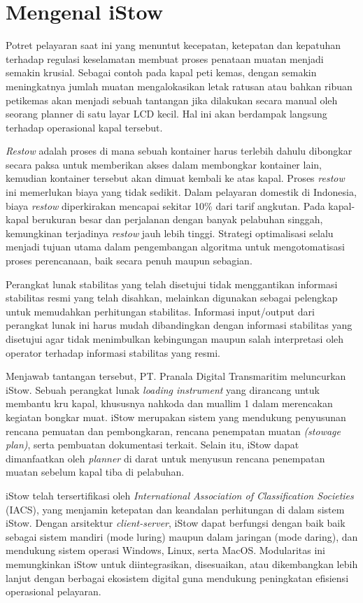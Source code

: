 \chapter{Mengenal iStow}
\label{ch:mengenal-iStow}


Potret pelayaran saat ini yang menuntut kecepatan, ketepatan dan kepatuhan terhadap regulasi keselamatan membuat proses penataan muatan menjadi semakin krusial. Sebagai contoh pada kapal peti kemas, dengan semakin meningkatnya jumlah muatan mengalokasikan letak ratusan atau bahkan ribuan petikemas akan menjadi sebuah tantangan jika dilakukan secara manual oleh seorang planner di satu layar LCD kecil. Hal ini akan berdampak langsung terhadap operasional kapal tersebut.

{ \em Restow} adalah proses di mana sebuah kontainer harus terlebih dahulu dibongkar secara paksa untuk memberikan akses dalam membongkar kontainer lain, kemudian kontainer tersebut akan dimuat kembali ke atas kapal. Proses {\em restow} ini memerlukan biaya yang tidak sedikit. Dalam pelayaran domestik di Indonesia, biaya {\em restow} diperkirakan mencapai sekitar 10\% dari tarif angkutan. Pada kapal-kapal berukuran besar dan perjalanan dengan banyak pelabuhan singgah, kemungkinan terjadinya {\em restow} jauh lebih tinggi. Strategi optimalisasi selalu menjadi tujuan utama dalam pengembangan algoritma untuk mengotomatisasi proses perencanaan, baik secara penuh maupun sebagian.

Perangkat lunak stabilitas yang telah disetujui tidak menggantikan informasi stabilitas resmi yang telah disahkan, melainkan digunakan sebagai pelengkap untuk memudahkan perhitungan stabilitas. Informasi input/output dari perangkat lunak ini harus mudah dibandingkan dengan informasi stabilitas yang disetujui agar tidak menimbulkan kebingungan maupun salah interpretasi oleh operator terhadap informasi stabilitas yang resmi.

Menjawab tantangan tersebut, PT. Pranala Digital Transmaritim meluncurkan iStow. Sebuah perangkat lunak {\em loading instrument} yang dirancang untuk membantu kru kapal, khususnya nahkoda dan muallim 1 dalam merencakan kegiatan bongkar muat. iStow merupakan sistem yang mendukung penyusunan rencana pemuatan dan pembongkaran, rencana penempatan muatan {\em(stowage plan)}, serta pembuatan dokumentasi terkait. Selain itu, iStow dapat dimanfaatkan oleh {\em planner} di darat untuk menyusun rencana penempatan muatan sebelum kapal tiba di pelabuhan.

iStow telah tersertifikasi  oleh {\em International Association of Classification Societies} (IACS), yang menjamin ketepatan dan keandalan perhitungan di dalam sistem iStow. Dengan arsitektur {\em client-server}, iStow dapat berfungsi dengan baik baik sebagai sistem mandiri (mode luring) maupun dalam jaringan (mode daring), dan mendukung sistem operasi Windows, Linux, serta MacOS. Modularitas ini memungkinkan iStow untuk diintegrasikan, disesuaikan, atau dikembangkan lebih lanjut dengan berbagai ekosistem digital guna mendukung peningkatan efisiensi operasional pelayaran.\\

